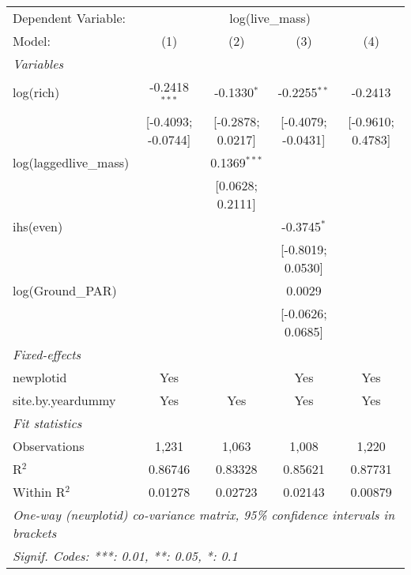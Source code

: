 \begin{tabular}{lcccc}
\tabularnewline\midrule\midrule
Dependent Variable:&\multicolumn{4}{c}{log(live\_mass)}\\
Model:&(1) & (2) & (3) & (4)\\
\midrule \emph{Variables}&   &   &   &  \\
log(rich)&-0.2418$^{***}$ & -0.1330$^{*}$ & -0.2255$^{**}$ & -0.2413\\
  &[-0.4093; -0.0744] & [-0.2878; 0.0217] & [-0.4079; -0.0431] & [-0.9610; 0.4783]\\
log(laggedlive\_mass)&   & 0.1369$^{***}$ &    &   \\
  &   & [0.0628; 0.2111] &    &   \\
ihs(even)&   &    & -0.3745$^{*}$ &   \\
  &   &    & [-0.8019; 0.0530] &   \\
log(Ground\_PAR)&   &    & 0.0029 &   \\
  &   &    & [-0.0626; 0.0685] &   \\
\midrule \emph{Fixed-effects}&   &   &   &  \\
newplotid & Yes &  & Yes & Yes\\
site.by.yeardummy & Yes & Yes & Yes & Yes\\
\midrule \emph{Fit statistics}&  & & & \\
Observations & 1,231&1,063&1,008&1,220\\
R$^2$ & 0.86746&0.83328&0.85621&0.87731\\
Within R$^2$ & 0.01278&0.02723&0.02143&0.00879\\
\midrule\midrule\multicolumn{5}{l}{\emph{One-way (newplotid) co-variance matrix, 95\% confidence intervals in brackets}}\\
\multicolumn{5}{l}{\emph{Signif. Codes: ***: 0.01, **: 0.05, *: 0.1}}\\
\end{tabular}


